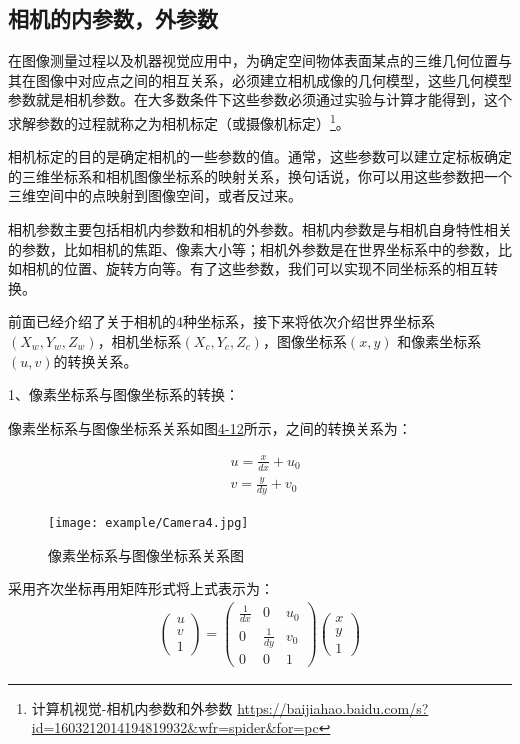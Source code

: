 \subsection{相机的内参数，外参数}

在图像测量过程以及机器视觉应用中，为确定空间物体表面某点的三维几何位置与其在图像中对应点之间的相互关系，必须建立相机成像的几何模型，这些几何模型参数就是相机参数。在大多数条件下这些参数必须通过实验与计算才能得到，这个求解参数的过程就称之为相机标定（或摄像机标定）\footnote{计算机视觉-相机内参数和外参数 \quad \url{https://baijiahao.baidu.com/s?id=1603212014194819932&wfr=spider&for=pc}}。

相机标定的目的是确定相机的一些参数的值。通常，这些参数可以建立定标板确定的三维坐标系和相机图像坐标系的映射关系，换句话说，你可以用这些参数把一个三维空间中的点映射到图像空间，或者反过来。

相机参数主要包括相机内参数和相机的外参数。相机内参数是与相机自身特性相关的参数，比如相机的焦距、像素大小等；相机外参数是在世界坐标系中的参数，比如相机的位置、旋转方向等。有了这些参数，我们可以实现不同坐标系的相互转换。

前面已经介绍了关于相机的4种坐标系，接下来将依次介绍世界坐标系$(X_w,Y_w,Z_w)$，相机坐标系$(X_c,Y_c,Z_c)$，图像坐标系$(x,y)$ 和像素坐标系$(u,v)$的转换关系。

1、像素坐标系与图像坐标系的转换：

像素坐标系与图像坐标系关系如图\href{fig:4-12}{4-12}所示，之间的转换关系为：

\begin{align}
& u = \frac{x}{dx} + u_0  \\
& v = \frac{y}{dy} + v_0
\end{align}

\begin{figure}[!htp]
\centering
\texttt{[image: example/Camera4.jpg]}
\caption{像素坐标系与图像坐标系关系图}
\label{fig1:4-12}
\end{figure}

采用齐次坐标再用矩阵形式将上式表示为：
\begin{align}
\begin{pmatrix}
u \\ v \\ 1
\end{pmatrix}
=
\begin{pmatrix}
\frac{1}{dx} & 0 & u_0 \\
0 & \frac{1}{dy} & v_0 \\
0 & 0 & 1
\end{pmatrix}
\begin{pmatrix}
x \\ y \\ 1
\end{pmatrix}
\end{align}

